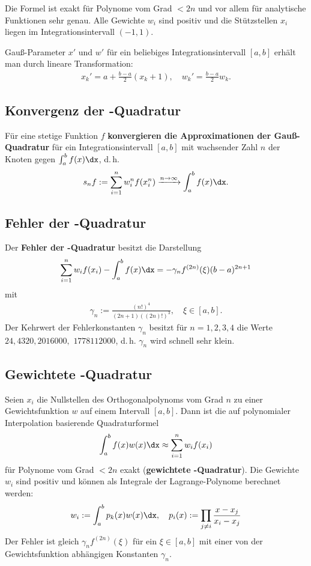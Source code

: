 Die Formel ist exakt für Polynome vom Grad $< 2n$ und vor allem für analytische
Funktionen sehr genau.
Alle Gewichte $w_i$ sind positiv und
die Stützstellen $x_i$ liegen im Integrationsintervall $(-1, 1)$.

Gauß-Parameter $x'$ und $w'$ für ein beliebiges Integrationsintervall $[a, b]$
erhält man durch lineare Transformation:
\begin{align*}
    x_k' = a + \frac{b - a}{2} (x_k + 1), \quad
    w_k' = \frac{b - a}{2} w_k.
\end{align*}

\subsection{%
    Konvergenz der -Quadratur%
}

Für eine stetige Funktion $f$
\textbf{konvergieren die Approximationen der Gauß-Quadratur}
für ein Integrationsintervall $[a, b]$ mit wachsender Zahl $n$
der Knoten gegen $\int_a^b f(x)\dx$, d.\,h.
\begin{align*}
    s_n f := \sum_{i=1}^n w_i^n f(x_i^n) \xrightarrow{n \to \infty}
    \int_a^b f(x)\dx.
\end{align*}

\subsection{%
    Fehler der -Quadratur%
}

Der \textbf{Fehler der -Quadratur} besitzt die Darstellung
\begin{align*}
    \sum_{i=1}^n w_i f(x_i) - \int_a^b f(x)\dx =
    -\gamma_n f^{(2n)}(\xi)(b - a)^{2n + 1}
\end{align*}
mit
\begin{align*}
    \gamma_n := \frac{(n!)^4}{(2n + 1)((2n)!)^3},\quad \xi \in [a, b].
\end{align*}
Der Kehrwert der Fehlerkonstanten $\gamma_n$ besitzt für $n = 1, 2, 3, 4$
die Werte $24, 4320, 2016000,$
$1778112000$, d.\,h. $\gamma_n$ wird schnell sehr klein.

\subsection{%
    Gewichtete -Quadratur%
}

Seien $x_i$ die Nullstellen des Orthogonalpolynoms vom Grad $n$ zu einer
Gewichtsfunktion $w$ auf einem Intervall $[a, b]$.
Dann ist die auf polynomialer Interpolation basierende Quadraturformel
\begin{align*}
    \int_a^b f(x)w(x)\dx \approx \sum_{i=1}^n w_i f(x_i)
\end{align*}
für Polynome vom Grad $< 2n$ exakt
(\textbf{gewichtete -Quadratur}).
Die Gewichte $w_i$ sind positiv und können als Integrale der Lagrange-Polynome
berechnet werden:
\begin{align*}
    w_i := \int_a^b p_k(x)w(x)\dx, \quad
    p_i(x) := \prod_{j \not= i} \frac{x - x_j}{x_i - x_j}
\end{align*}
Der Fehler ist gleich $\gamma_n f^{(2n)}(\xi)$ für ein $\xi \in [a, b]$
mit einer von der Gewichtsfunktion abhängigen Konstanten $\gamma_n$.

